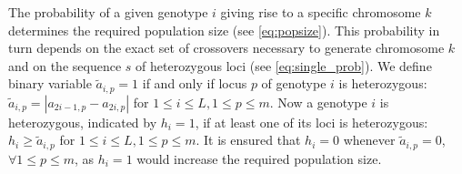 \documentclass[runningheads]{llncs}
\begin{document}
The probability of a given genotype $i$ giving rise to a specific chromosome $k$ determines the 
required population size (see \eqref{eq:popsize}). This probability in turn depends on the exact set of
crossovers necessary to generate chromosome $k$ and on the sequence $s$ of heterozygous
loci (see \eqref{eq:single_prob}). We define binary variable $\tilde{a}_{i,p}=1$ if and only if locus $p$ of genotype $i$ is heterozygous: $\tilde{a}_{i,p} = |a_{2i-1,p} - a_{2i,p}|$ for $1 \leq i \leq L, 1 \leq p \leq m$.
Now a genotype $i$ is heterozygous, indicated by $h_i=1$, if at least one of its loci is heterozygous: $h_i \geq \tilde{a}_{i,p}$ for  $1 \leq i \leq L, 1 \leq p \leq m$.
It is ensured that $h_i=0$ whenever $\tilde{a}_{i,p}=0$, $\forall 1 \leq p \leq m$, as $h_i=1$ would increase the required population size.
\end{document}
